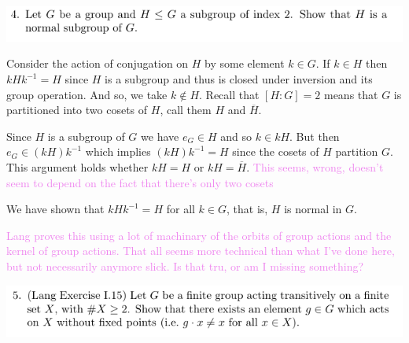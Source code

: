 \documentclass[12pt,letterpaper,boxed]{hmcpset}
\newcommand{\wg}[1]{\textcolor{violet}{#1}}
\newcommand{\inv}{^{-1}}
\begin{document}
\newpage


\begin{problem}
	\includegraphics[scale=0.8]{4.png}
	\hfill
\end{problem}

\begin{solution}
Consider the action of conjugation on $H$ by some element $k \in G$.
If $k \in H$ then $k H k \inv = H$ since $H$ is a subgroup and thus is
closed under inversion and its group operation. And so, we
take $k \not \in H$.
Recall that $[H:G] = 2$ means that $G$ is partitioned into two cosets
of $H$, call them $H$ and $\overline H$.

Since $H$ is a subgroup of $G$ we have $e_G
\in H$ and so $k \in k H$. 
But then $e_G \in (kH)k\inv$ which implies $(kH)k\inv = H$ since
the cosets of $H$ partition $G$. This argument holds whether $kH = H$ or $kH =
\overline H$.
\wg{This seems, wrong, doesn't seem to depend on the fact that there's only two cosets}

We have shown that $k H k\inv = H$ for all $k \in G$, that is, $H$ is
normal in $G$.

\wg{Lang proves this using a lot of machinary of the orbits of group
actions and the kernel of group actions. That all seems more technical
than what I've done here, but not necessarily anymore slick. Is that
tru, or am I missing something?}

\end{solution}

\newpage



\begin{problem}
	\includegraphics[scale=0.8]{5.png}
	\hfill
\end{problem}

\begin{solution}
\end{solution}

\newpage
\end{document}
